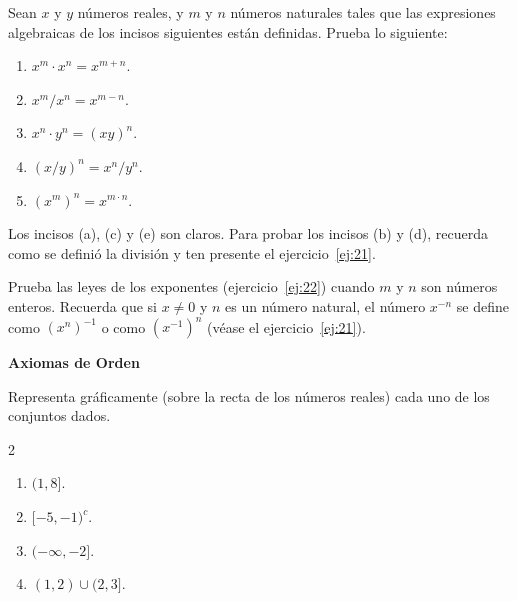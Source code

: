 \documentclass[12pt,a4paper]{book}
\newcommand{\subtitulo}[1]{\par\avoidorphan{5}\addvspace{\medskipamount}\noindent\textbf{#1}\par\nobreak}
\begin{document}
    \begin{ejercicio}\label{ej:22}
        Sean $x$ y $y$ números reales, y
        $m$ y $n$ números naturales tales que las expresiones algebraicas de los incisos
        siguientes están definidas. Prueba lo siguiente:
        \begin{enumerate}[nosep]
            \item $x^{m}\cdot x^{n}=x^{m+n}$.
            \item $x^{m}/x^{n}=x^{m-n}$.
            \item $x^{n}\cdot y^{n}=(xy)^{n}$.
            \item $(x/y)^{n}=x^{n}/y^{n}$.
            \item $(x^{m})^{n}=x^{m\cdot n}$.
        \end{enumerate}
        \sugerencia Los incisos (a), (c) y (e) son claros. Para probar los incisos (b)
        y (d), recuerda como se definió la división y ten presente el ejercicio~\ref{ej:21}.
    \end{ejercicio}

    \begin{ejercicio}\label{ej:23}
        Prueba las leyes de los exponentes (ejercicio~\ref{ej:22}) cuando $m$
        y $n$ son números enteros. \sugerencia Recuerda que si $x\neq 0$ y $n$ es un
        número natural, el número $x^{-n}$ se define como $(x^{n})^{-1}$ o como $(x^{-1})^{n}$ (véase
        el ejercicio~\ref{ej:21}).
    \end{ejercicio}

    \subtitulo{Axiomas de Orden}

    \begin{ejercicio}\label{ej:24}
        Representa gráficamente (sobre la recta de los números reales)
        cada uno de los conjuntos dados.
        \begin{multicols}{2}
        \begin{enumerate}[nosep]
            \item $(1,8]$.
            \item $[-5,-1)^{c}$.
            \item $(-\infty,-2]$.
            \item $(1,2)\cup(2,3]$.
        \end{enumerate}
        \end{multicols}
    \end{ejercicio}
\end{document}
